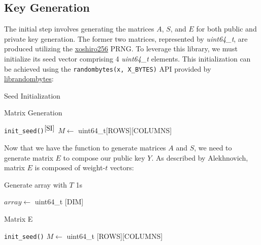 \subsection{Key Generation}
The initial step involves generating the matrices \(A\), \(S\), and \(E\) for both public and private key generation. The former two matrices, represented by \textit{uint64\_t}, are produced utilizing the \href{https://prng.di.unimi.it}{xoshiro256} PRNG. To leverage this library, we must initialize its seed vector comprising 4 \textit{uint64\_t} elements. This initialization can be achieved using the \texttt{randombytes(x, X\_BYTES)} API provided by \href{https://randombytes.cr.yp.to/index.html}{librandombytes}:
\begin{algorithm}[H]
\DontPrintSemicolon
\caption{Seed Initialization}
\label{SI}
\end{algorithm}
\begin{algorithm}[H]
\DontPrintSemicolon
\caption{Matrix Generation}
\label{GAS}
\texttt{init\_seed()}$^{\ref{SI}}$\;
$M \leftarrow$ uint64\_t[ROWS][COLUMNS]\;
\;
\end{algorithm}

Now that we have the function to generate matrices \(A\) and \(S\), we need to generate matrix \(E\) to compose our public key \(Y\). As described by Alekhnovich, matrix \(E\) is composed of weight-\(t\) vectors:

\begin{algorithm}[H]
\DontPrintSemicolon
\caption{Generate array with \(T\) 1s}
\label{GA}
$array \leftarrow$ uint64\_t [DIM]\;
\end{algorithm}

\begin{algorithm}[H]
\DontPrintSemicolon
\caption{Matrix E\label{GE}}
\texttt{init\_seed()}\;
$M \leftarrow$ uint64\_t [ROWS][COLUMNS]\;
\;
\end{algorithm}


